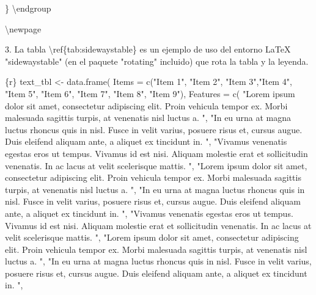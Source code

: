 \documentclass[11pt,a4paper,oneside,]{article}
\newenvironment{Shaded}{\begin{snugshade}}{\end{snugshade}}
\newcommand{\AttributeTok}[1]{\textcolor[rgb]{0.77,0.63,0.00}{#1}}
\newcommand{\FloatTok}[1]{\textcolor[rgb]{0.00,0.00,0.81}{#1}}
\newcommand{\NormalTok}[1]{#1}
\newcommand{\SpecialCharTok}[1]{\textcolor[rgb]{0.00,0.00,0.00}{#1}}
\newcommand{\StringTok}[1]{\textcolor[rgb]{0.31,0.60,0.02}{#1}}
\numberwithin{dummy}{section}
\theoremstyle{ocrenumbox}
\theoremstyle{blacknumex}
\theoremstyle{blacknumbox}
\theoremstyle{ocrenum}
\theoremstyle{ocrenum}
\begin{document}
\begin{Shaded}
\begin{Highlighting}[numbers=left,,firstnumber=701,]
\StringTok{\textasciigrave{}\textasciigrave{}\textasciigrave{}}
\NormalTok{\}}
\NormalTok{\textbackslash{}endgroup}

\NormalTok{\textbackslash{}newpage}
\StringTok{\textasciigrave{}\textasciigrave{}\textasciigrave{}\textasciigrave{}}

\FloatTok{3.}\NormalTok{ La tabla \textbackslash{}ref\{tab}\SpecialCharTok{:}\NormalTok{sidewaystable\} es un ejemplo de uso del entorno LaTeX }\StringTok{"sidewaystable"}\NormalTok{ (en el paquete }\StringTok{"rotating"}\NormalTok{ incluido) que rota la tabla y la leyenda.}

\StringTok{\textasciigrave{}\textasciigrave{}\textasciigrave{}}\AttributeTok{\{r\}}
\AttributeTok{text\_tbl \textless{}{-} data.frame(}
\AttributeTok{  Items = c("Item 1", "Item 2", "Item 3","Item 4", "Item 5", "Item 6", }
\AttributeTok{            "Item 7", "Item 8", "Item 9"), }
\AttributeTok{  Features = c(}
\AttributeTok{    "Lorem ipsum dolor sit amet, consectetur adipiscing elit.}
\AttributeTok{    Proin vehicula tempor ex. Morbi malesuada sagittis turpis,}
\AttributeTok{    at venenatis nisl luctus a. ",}
\AttributeTok{    "In eu urna at magna luctus rhoncus quis in nisl. Fusce in velit}
\AttributeTok{    varius, posuere risus et, cursus augue. Duis eleifend aliquam ante,}
\AttributeTok{    a aliquet ex tincidunt in. ",}
\AttributeTok{    "Vivamus venenatis egestas eros ut tempus. Vivamus id est nisi.}
\AttributeTok{    Aliquam molestie erat et sollicitudin venenatis. In ac lacus at}
\AttributeTok{    velit scelerisque mattis. ",}
\AttributeTok{    "Lorem ipsum dolor sit amet, consectetur adipiscing elit.}
\AttributeTok{    Proin vehicula tempor ex. Morbi malesuada sagittis turpis,}
\AttributeTok{    at venenatis nisl luctus a. ",}
\AttributeTok{    "In eu urna at magna luctus rhoncus quis in nisl. Fusce in velit}
\AttributeTok{    varius, posuere risus et, cursus augue. Duis eleifend aliquam ante,}
\AttributeTok{    a aliquet ex tincidunt in. ",}
\AttributeTok{    "Vivamus venenatis egestas eros ut tempus. Vivamus id est nisi.}
\AttributeTok{    Aliquam molestie erat et sollicitudin venenatis. In ac lacus at}
\AttributeTok{    velit scelerisque mattis. ",}
\AttributeTok{    "Lorem ipsum dolor sit amet, consectetur adipiscing elit.}
\AttributeTok{    Proin vehicula tempor ex. Morbi malesuada sagittis turpis,}
\AttributeTok{    at venenatis nisl luctus a. ",}
\AttributeTok{    "In eu urna at magna luctus rhoncus quis in nisl. Fusce in velit}
\AttributeTok{    varius, posuere risus et, cursus augue. Duis eleifend aliquam ante,}
\AttributeTok{    a aliquet ex tincidunt in. ",}

\end{Highlighting}
\end{Shaded}
\end{document}
